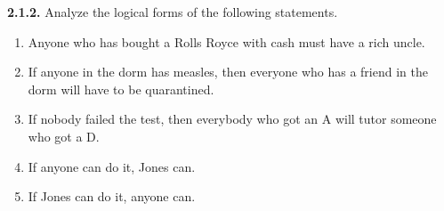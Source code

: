 \documentclass[12pt]{amsart}
\newenvironment{statement}[1]{\smallskip\noindent\color[rgb]{.6627, .3529, .6314} {\bf #1.}}{}
\theoremstyle{definition}
\theoremstyle{remark}
\begin{document}
\begin{statement}{2.1.2}
Analyze the logical forms of the following statements.
\begin{enumerate}
	\item Anyone who has bought a Rolls Royce with cash must have a rich uncle.
	
	\item If anyone in the dorm has measles, then everyone who has a friend in the dorm will have to be quarantined.
	
	\item If nobody failed the test, then everybody who got an A will tutor someone who got a D.
	
	\item If anyone can do it, Jones can.
	
	\item If Jones can do it, anyone can.
\end{enumerate}
\end{statement}
\end{document}
